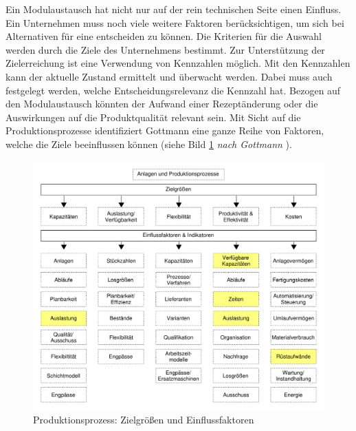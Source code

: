 Ein Modulaustausch hat nicht nur auf der rein technischen Seite einen Einfluss. Ein Unternehmen muss noch viele weitere Faktoren berücksichtigen, um sich bei Alternativen für eine entscheiden zu können. Die Kriterien für die Auswahl werden durch die Ziele des Unternehmens bestimmt. Zur Unterstützung der Zielerreichung ist eine Verwendung von Kennzahlen möglich. Mit den Kennzahlen kann der aktuelle Zustand ermittelt und überwacht werden. Dabei muss auch festgelegt werden, welche Entscheidungsrelevanz die Kennzahl hat.  Bezogen auf den Modulaustausch könnten der Aufwand einer Rezeptänderung oder die Auswirkungen auf die Produktqualität relevant sein. Mit Sicht auf die Produktionsprozesse identifiziert Gottmann \cite{Gottmann2016} eine ganze Reihe von Faktoren, welche die Ziele beeinflussen können (siehe Bild \ref{pic:Produktionsprozesse-Zielgroessen}  \textit{nach Gottmann} \citep[50]{Gottmann2016}).
\begin{figure}[htb]
\centering
\includegraphics[scale=0.5]{DA_files/Bilder/Analyse/Produktionsprozesse-Zielgroessen.pdf}
\caption{Produktionsprozess: Zielgrößen und Einflussfaktoren \citep[50]{Gottmann2016}}
\label{pic:Produktionsprozesse-Zielgroessen}
\end{figure}

